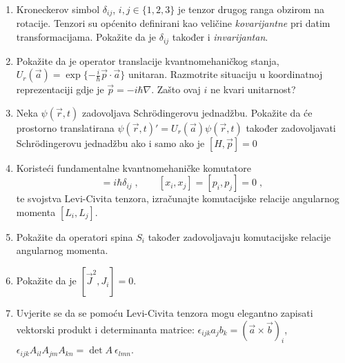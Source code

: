 \begin{enumerate}[label=\arabic{chapter}.\arabic*.]

\item \label{zad:kronecker} Kroneckerov simbol $\delta_{ij}$, $i,j \in \{1, 2, 3\}$ je tenzor drugog ranga
    obzirom na rotacije. Tenzori su općenito definirani kao veličine 
    \emph{kovarijantne} pri datim transformacijama. Pokažite da je $\delta_{ij}$
    također i \emph{invarijantan}.
\item Pokažite da je operator translacije kvantnomehaničkog stanja,
 $U_{r}(\vec{a}) = \exp \{-\frac{i}{\hbar} \vec{p}\cdot \vec{a} \}$
unitaran. Razmotrite situaciju u koordinatnoj reprezentaciji gdje
je $\vec{p} = -i \hbar \nabla$. Zašto ovaj $i$ ne kvari unitarnost?

\item Neka $\psi(\vec{r}, t)$ zadovoljava Schr\"{o}dingerovu jednadžbu.
Pokažite da će prostorno translatirana $\psi(\vec{r}, t)' = 
U_{r}(\vec{a}) \psi(\vec{r}, t)$ također zadovoljavati Schr\"{o}dingerovu
jednadžbu ako i samo ako je $[H, \vec{p}] = 0$

\item Koristeći fundamentalne kvantnomehaničke komutatore
\begin{equation}
 [x_i, p_j] = i\hbar \delta_{ij}\;, \qquad
 [x_i, x_j] = [p_i, p_j] = 0 \;,
\end{equation}
te svojstva Levi-Civita tenzora, izračunajte komutacijske
relacije angularnog momenta $[L_i, L_j]$.

\item Pokažite da operatori spina $S_i$ također zadovoljavaju komutacijske
relacije angularnog momenta.

\item Pokažite da je $[\vec{J}^2, J_i] = 0$.
\item \label{zad:levicivita} Uvjerite se da se pomoću Levi-Civita tenzora mogu elegantno zapisati
    vektorski produkt i determinanta matrice: $\epsilon_{ijk}a_{j}b_{k}
    = (\vec{a}\times\vec{b})_{i}$, $\epsilon_{ijk}A_{il}A_{jm}A_{kn} = \det A \: \epsilon_{lmn}$.
\end{enumerate}
